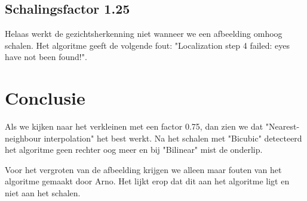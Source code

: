 \documentclass{article}
\begin{document}
\clearpage

\clearpage
\subsection{Schalingsfactor 1.25}
Helaas werkt de gezichtsherkenning niet wanneer we een afbeelding omhoog schalen. Het algoritme geeft de volgende fout: "Localization step 4 failed: eyes have not been found!".
    
\section{Conclusie}
Als we kijken naar het verkleinen met een factor 0.75, dan zien we dat "Nearest-neighbour interpolation" het best werkt. Na het schalen met "Bicubic" detecteerd het algoritme geen rechter oog meer en bij "Bilinear" mist de onderlip. 

Voor het vergroten van de afbeelding krijgen we alleen maar fouten van het algoritme gemaakt door Arno. Het lijkt erop dat dit aan het algoritme ligt en niet aan het schalen. 
\end{document}
